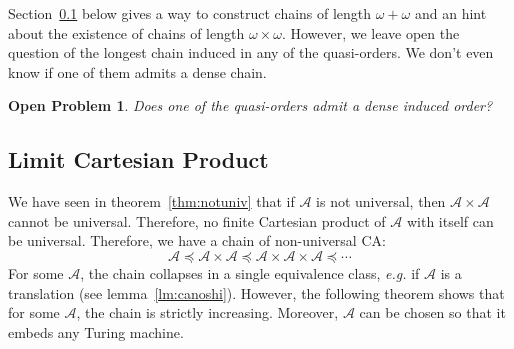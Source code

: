 \documentclass[a4paper]{elsarticle}
\newcommand{\ACA}{\mathcal{A}}
\newcommand{\simu}{\preccurlyeq}
\newtheorem{openpb}{Open Problem}
\begin{document}
Section~\ref{sec:limprod} below gives a way to construct chains of
length ${\omega+\omega}$ and an hint about the existence of chains of
length ${\omega\times\omega}$. However, we leave open the question of
the longest chain induced in any of the quasi-orders. We don't even
know if one of them admits a dense chain.

\begin{openpb}
  Does one of the quasi-orders admit a dense induced order?
\end{openpb}

\subsection{Limit Cartesian Product}
\label{sec:limprod}

We have seen in theorem~\ref{thm:notuniv} that if $\ACA$ is not
universal, then $\ACA\times\ACA$ cannot be universal. Therefore, no
finite Cartesian product of $\ACA$ with itself can be
universal. Therefore, we have a chain of non-universal CA:
\[\ACA\simu\ACA\times\ACA\simu\ACA\times\ACA\times\ACA\simu\cdots\]
For some $\ACA$, the chain collapses in a single equivalence class,
\textit{e.g.} if $\ACA$ is a translation (see
lemma~\ref{lm:canoshi}). However, the following theorem shows that for
some $\ACA$, the chain is strictly increasing. Moreover, $\ACA$ can be
chosen so that it embeds any Turing machine. 
\end{document}
